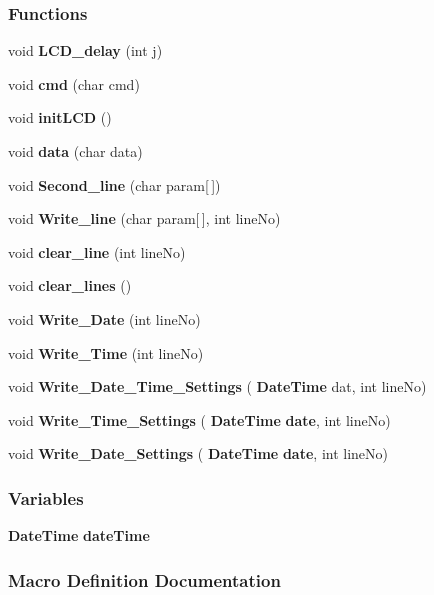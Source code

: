 \subsubsection*{Functions}
\begin{DoxyCompactItemize}
\item 
void \textbf{ L\+C\+D\+\_\+delay} (int j)
\item 
void \textbf{ cmd} (char cmd)
\item 
void \textbf{ init\+L\+CD} ()
\item 
void \textbf{ data} (char data)
\item 
void \textbf{ Second\+\_\+line} (char param[$\,$])
\item 
void \textbf{ Write\+\_\+line} (char param[$\,$], int line\+No)
\item 
void \textbf{ clear\+\_\+line} (int line\+No)
\item 
void \textbf{ clear\+\_\+lines} ()
\item 
void \textbf{ Write\+\_\+\+Date} (int line\+No)
\item 
void \textbf{ Write\+\_\+\+Time} (int line\+No)
\item 
void \textbf{ Write\+\_\+\+Date\+\_\+\+Time\+\_\+\+Settings} (\textbf{ Date\+Time} dat, int line\+No)
\item 
void \textbf{ Write\+\_\+\+Time\+\_\+\+Settings} (\textbf{ Date\+Time} \textbf{ date}, int line\+No)
\item 
void \textbf{ Write\+\_\+\+Date\+\_\+\+Settings} (\textbf{ Date\+Time} \textbf{ date}, int line\+No)
\end{DoxyCompactItemize}
\subsubsection*{Variables}
\begin{DoxyCompactItemize}
\item 
\textbf{ Date\+Time} \textbf{ date\+Time}
\end{DoxyCompactItemize}


\subsubsection{Macro Definition Documentation}
\mbox{\label{a00035_ade175c7fce8dfe5037ba9b98f1fc63c2}} 
